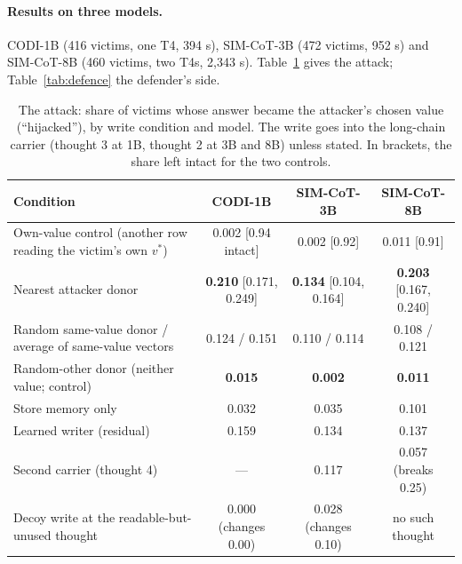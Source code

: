 \documentclass{article}
\begin{document}
\paragraph{Results on three models.} CODI-1B (416 victims, one T4, 394 s), SIM-CoT-3B (472 victims, 952 s) and SIM-CoT-8B (460 victims, two T4s, 2,343 s). Table~\ref{tab:hijack} gives the attack; Table~\ref{tab:defence} the defender's side.

\begin{table}[h]
\caption{The attack: share of victims whose answer became the attacker's chosen value (``hijacked''), by write condition and model. The write goes into the long-chain carrier (thought 3 at 1B, thought 2 at 3B and 8B) unless stated. In brackets, the share left intact for the two controls.}
\label{tab:hijack}
\centering\scriptsize
\setlength{\tabcolsep}{4pt}
\begin{tabular}{lccc}
\toprule
Condition & CODI-1B & SIM-CoT-3B & SIM-CoT-8B \\
\midrule
Own-value control (another row reading the victim's own $v^*$) & 0.002 [0.94 intact] & 0.002 [0.92] & 0.011 [0.91] \\
Nearest attacker donor & \textbf{0.210} [0.171, 0.249] & \textbf{0.134} [0.104, 0.164] & \textbf{0.203} [0.167, 0.240] \\
Random same-value donor / average of same-value vectors & 0.124 / 0.151 & 0.110 / 0.114 & 0.108 / 0.121 \\
Random-other donor (neither value; control) & \textbf{0.015} & \textbf{0.002} & \textbf{0.011} \\
Store memory only & 0.032 & 0.035 & 0.101 \\
Learned writer (residual) & 0.159 & 0.134 & 0.137 \\
Second carrier (thought 4) & --- & 0.117 & 0.057 (breaks 0.25) \\
Decoy write at the readable-but-unused thought & 0.000 (changes 0.00) & 0.028 (changes 0.10) & no such thought \\
\bottomrule
\end{tabular}
\end{table}
\end{document}
